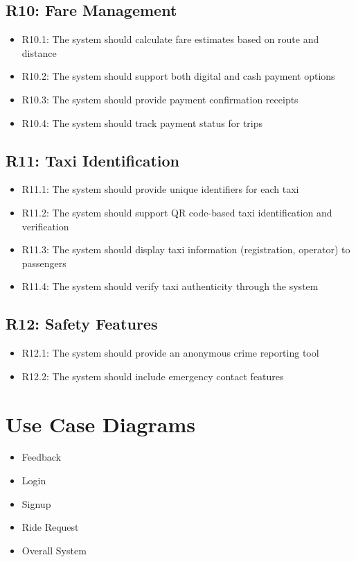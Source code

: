 \documentclass[a4paper,12pt]{article}
\begin{document}
\subsection*{R10: Fare Management}
\begin{itemize}
    \item R10.1: The system should calculate fare estimates based on route and distance
    \item R10.2: The system should support both digital and cash payment options
    \item R10.3: The system should provide payment confirmation receipts
    \item R10.4: The system should track payment status for trips
\end{itemize}

\subsection*{R11: Taxi Identification}
\begin{itemize}
    \item R11.1: The system should provide unique identifiers for each taxi
    \item R11.2: The system should support QR code-based taxi identification and verification
    \item R11.3: The system should display taxi information (registration, operator) to passengers
    \item R11.4: The system should verify taxi authenticity through the system
\end{itemize}

\subsection*{R12: Safety Features}
\begin{itemize}
    \item R12.1: The system should provide an anonymous crime reporting tool
    \item R12.2: The system should include emergency contact features
\end{itemize}

\section{Use Case Diagrams}
\begin{itemize}
    \item Feedback
    \item Login
    \item Signup
    \item Ride Request
    \item Overall System
\end{itemize}
\end{document}
